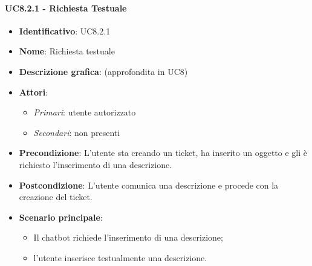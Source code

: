   \paragraph{UC8.2.1 - Richiesta Testuale}
  \begin{itemize}
     \item \textbf{Identificativo}: UC8.2.1
     \item \textbf{Nome}: Richiesta testuale
     \item \textbf{Descrizione grafica}: (approfondita in UC8)
     \item \textbf{Attori}:
     \begin{itemize} 
         \item \textit{Primari}: utente autorizzato
         \item \textit{Secondari}: non presenti
     \end{itemize}
         \item \textbf{Precondizione}: L'utente sta creando un ticket, ha inserito un oggetto e gli è richiesto l'inserimento di una descrizione.
         \item \textbf{Postcondizione}: L'utente comunica una descrizione e procede con la creazione del ticket. 
      \item \textbf{Scenario principale}: 
         \begin{itemize}
             \item Il chatbot richiede l'inserimento di una descrizione;
             \item l'utente inserisce testualmente una descrizione.
         \end{itemize}
  \end{itemize}
  
